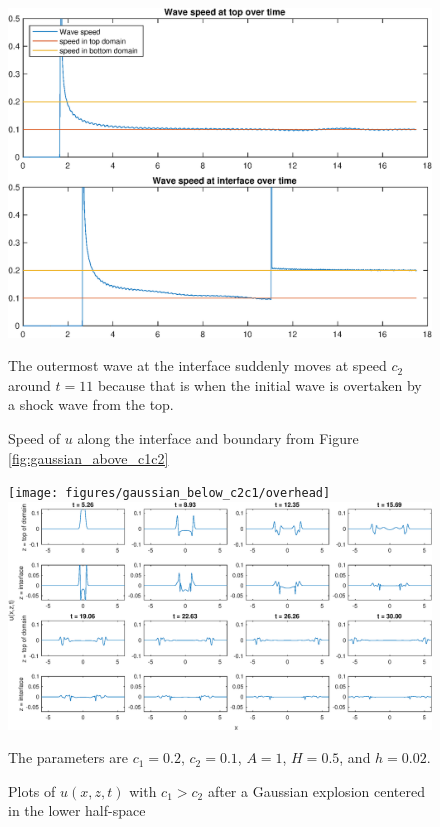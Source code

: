 \documentclass[11pt,letter,subeqn,fleqn]{article}
\numberwithin{equation}{section}
\numberwithin{table}{section}
\numberwithin{figure}{section}
\begin{document}
\begin{figure}[htbp]
	\caption{Speed of $u$ along the interface and boundary from Figure \ref{fig:gaussian_above_c1c2}}
	\label{fig:gaussian_above_c1c2_speed}
	\includegraphics[width=\linewidth]{figures/gaussian_above_c1c2/wavespeeds}
\footnotesize
\centering

The outermost wave at the interface suddenly moves at speed $c_2$ around $t=11$ because that is when the initial wave is overtaken by a shock wave from the top.
\end{figure}


\begin{figure}[htbp]
	\caption{Plots of $u(x,z,t)$ with $c_1>c_2$ after a Gaussian explosion centered in the lower half-space}
	\label{fig:gaussian_below_c2c1}
	\texttt{[image: figures/gaussian\_below\_c2c1/overhead]}
	\includegraphics[width=\linewidth]{figures/gaussian_below_c2c1/u_inter_boundary}
\footnotesize
\centering

The parameters are $c_1 = 0.2$, $c_2 = 0.1$, $A=1$, $H=0.5$, and $h = 0.02$.
\end{figure}
\end{document}
